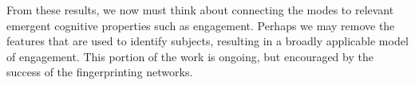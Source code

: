 From these results, we now must think about connecting the modes to relevant emergent cognitive properties such as engagement. Perhaps we may remove the features that are used to identify subjects, resulting in a broadly applicable model of engagement. This portion of the work is ongoing, but encouraged by the success of the fingerprinting networks.
 









